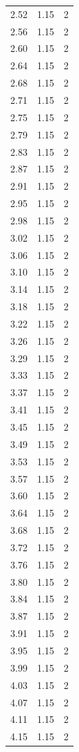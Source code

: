 \begin{longtable}{lrr}
  2.52 & 1.15 & 2 \\
  2.56 & 1.15 & 2 \\
  2.60 & 1.15 & 2 \\
  2.64 & 1.15 & 2 \\
  2.68 & 1.15 & 2 \\
  2.71 & 1.15 & 2 \\
  2.75 & 1.15 & 2 \\
  2.79 & 1.15 & 2 \\
  2.83 & 1.15 & 2 \\
  2.87 & 1.15 & 2 \\
  2.91 & 1.15 & 2 \\
  2.95 & 1.15 & 2 \\
  2.98 & 1.15 & 2 \\
  3.02 & 1.15 & 2 \\
  3.06 & 1.15 & 2 \\
  3.10 & 1.15 & 2 \\
  3.14 & 1.15 & 2 \\
  3.18 & 1.15 & 2 \\
  3.22 & 1.15 & 2 \\
  3.26 & 1.15 & 2 \\
  3.29 & 1.15 & 2 \\
  3.33 & 1.15 & 2 \\
  3.37 & 1.15 & 2 \\
  3.41 & 1.15 & 2 \\
  3.45 & 1.15 & 2 \\
  3.49 & 1.15 & 2 \\
  3.53 & 1.15 & 2 \\
  3.57 & 1.15 & 2 \\
  3.60 & 1.15 & 2 \\
  3.64 & 1.15 & 2 \\
  3.68 & 1.15 & 2 \\
  3.72 & 1.15 & 2 \\
  3.76 & 1.15 & 2 \\
  3.80 & 1.15 & 2 \\
  3.84 & 1.15 & 2 \\
  3.87 & 1.15 & 2 \\
  3.91 & 1.15 & 2 \\
  3.95 & 1.15 & 2 \\
  3.99 & 1.15 & 2 \\
  4.03 & 1.15 & 2 \\
  4.07 & 1.15 & 2 \\
  4.11 & 1.15 & 2 \\
  4.15 & 1.15 & 2 \\

\end{longtable}
